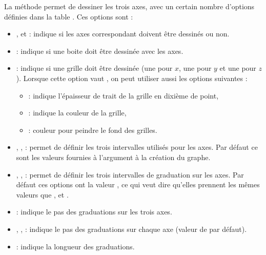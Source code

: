 La méthode  permet de dessiner les trois axes, avec un certain nombre d'options définies dans la table . Ces options sont :
\begin{itemize}
    \item {},  et  : indique si les axes correspondant doivent être dessinés ou non.

    \item {} : indique si une boite doit être dessinée avec les axes.

    \item {} : indique si une grille doit être dessinée (une pour $x$, une pour $y$ et une pour $z$). Lorsque cette option vaut \true, on peut utiliser aussi les options suivantes :
        \begin{itemize}
            \item {}: indique l'épaisseur de trait de la grille en dixième de point,
            \item {}: indique la couleur de la grille,
            \item {}: couleur pour peindre le fond des grilles.
        \end{itemize}
    
    \item {}, ,  : permet de définir les trois intervalles utilisés pour les axes. Par défaut ce sont les valeurs fournies à l'argument  à la création du graphe.

    \item {}, ,  : permet de définir les trois intervalles de graduation sur les axes. Par défaut ces options ont la valeur , ce qui veut dire qu'elles prennent les mêmes valeurs que ,  et .
    
    \item {} : indique le pas des graduations sur les trois axes.
    
    \item {}, ,  : indique le pas des graduations sur chaque axe (valeur de  par défaut).

    \item {} : indique la longueur des graduations.


\end{itemize}
